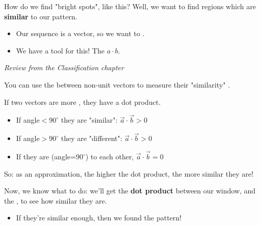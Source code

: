        How do we find "bright spots", like this? Well, we want to find regions which are \textbf{similar} to our pattern.

        \begin{itemize}
            \item Our sequence is a vector, so we want to .
            \item We have a tool for this! The  $a \cdot b$.\\
        \end{itemize}

        \begin{concept}
            \textit{Review from the Classification chapter}
            
            You can use the  between non-unit vectors to measure their "similarity" . 
            
            If two vectors are more , they have a  dot product. 
            
            \begin{itemize}
                \item If angle$<90^{\circ}$ they are "similar": $\vec{a} \cdot \vec{b} > 0$
                
                \item If angle$>90^{\circ}$ they are "different": $\vec{a} \cdot \vec{b} > 0$
                
                \item If they are  (angle=$90^{\circ}$) to each other, $\vec{a} \cdot \vec{b} = 0$
            \end{itemize}
        \end{concept}

        So: as an approximation, the higher the dot product, the more similar they are!

       

        Now, we know what to do: we'll get the \textbf{dot product} between our window, and the , to see how similar they are.

        \begin{itemize}
            \item If they're similar enough, then we found the pattern!\\
        \end{itemize}

